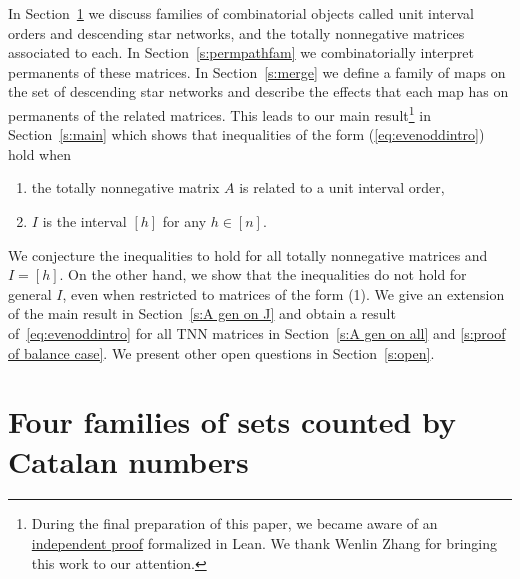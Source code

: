 \documentclass[12pt]{amsart}
\theoremstyle{definition}
\numberwithin{equation}{section}
\begin{document}
In Section~\ref{s:fourcatalan} we discuss families of combinatorial objects called unit interval orders and descending star networks, and the totally nonnegative matrices associated to each. In Section~\ref{s:permpathfam}
we combinatorially interpret permanents of these matrices.  In Section~\ref{s:merge} we define a family of maps on the set of descending star networks and describe the effects that each map has on permanents of the related matrices.
This leads to our main result\footnote{During the final preparation of this paper, we became aware of an \href{https://the-omega-institute.github.io/trureturing-mdbook/Problems/psw-bruhat-increasing-bijection.html}{independent proof} formalized in Lean. We thank Wenlin Zhang for bringing this work to our attention.} in Section~\ref{s:main}
which shows that inequalities of the form (\ref{eq:evenoddintro}) hold when
\begin{enumerate}
\item the totally nonnegative matrix $A$ is related to a unit interval order,
\item
$I$ is the interval $[h]$ for any $h \in [n]$.
\end{enumerate}
We conjecture the inequalities
to hold for all totally nonnegative matrices and $I = [h]$.
On the other hand, we show that the inequalities do not hold for general $I$, even when restricted to matrices of the form (1). We give an extension of the main result in Section~\ref{s:A gen on J} and obtain a result of~\eqref{eq:evenoddintro} for all TNN matrices in Section~\ref{s:A gen on all} and \ref{s:proof of balance case}.
We present other open questions in Section~\ref{s:open}.


\section{Four families of sets counted by Catalan numbers}\label{s:fourcatalan}
\end{document}
